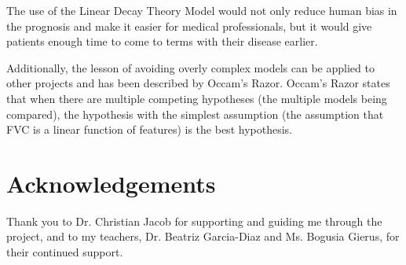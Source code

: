 \documentclass[12pt]{article}
\begin{document}

The use of the Linear Decay Theory Model would not only reduce human bias in the prognosis and make it easier for medical professionals, but it would give patients enough time to come to terms with their disease earlier. %

Additionally, the lesson of avoiding overly complex models can be applied to other projects and has been described by Occam's Razor.
Occam's Razor states that when there are multiple competing hypotheses (the multiple models being compared), the hypothesis with the simplest assumption (the assumption that FVC is a linear function of features) is the best hypothesis.

\section{Acknowledgements}

Thank you to Dr. Christian Jacob for supporting and guiding me through the project, and to my teachers, Dr. Beatriz Garcia-Diaz and Ms. Bogusia Gierus, for their continued support.


\printbibliography
\end{document}
